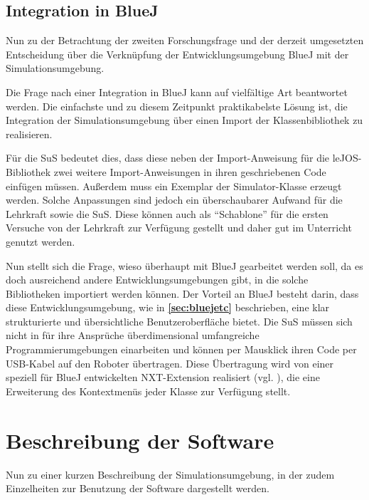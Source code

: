 \documentclass[paper=a4, DIV=calc, BCOR=12mm, twoside=on, onecolumn=on, open = right, titlepage =on, parskip =half-, headsepline = on, footsepline = off, chapterprefix = off, appendixprefix = on, fontsize = 12pt, numbers = noenddot, abstract = on]{scrbook}
\begin{document}
\par \singlespacing
\subsection{Integration in BlueJ}
\label{sec:integration}
\onehalfspacing
Nun zu der Betrachtung der zweiten Forschungsfrage und der derzeit umgesetzten Entscheidung über die Verknüpfung der Entwicklungsumgebung BlueJ mit der Simulationsumgebung.

Die Frage nach einer Integration in BlueJ kann auf vielfältige Art beantwortet werden. Die einfachste und zu diesem Zeitpunkt praktikabelste Lösung ist, die Integration der Simulationsumgebung über einen Import der Klassenbibliothek zu realisieren.

Für die SuS bedeutet dies, dass diese neben der Import-Anweisung für die leJOS-Bibliothek zwei weitere Import-Anweisungen in ihren geschriebenen Code einfügen müssen. Außerdem muss ein Exemplar der Simulator-Klasse erzeugt werden. Solche Anpassungen sind jedoch ein überschaubarer Aufwand für die Lehrkraft sowie die SuS. Diese können auch als "`Schablone"' für die ersten Versuche von der Lehrkraft zur Verfügung gestellt und daher gut im Unterricht genutzt werden.

Nun stellt sich die Frage, wieso überhaupt mit BlueJ gearbeitet werden soll, da es doch ausreichend andere Entwicklungsumgebungen gibt, in die solche Bibliotheken importiert werden können.
Der Vorteil an BlueJ besteht darin, dass diese Entwicklungsumgebung, wie in \textbf{\ref{sec:bluejetc}} beschrieben, eine klar strukturierte und übersichtliche Benutzeroberfläche bietet. Die SuS müssen sich nicht in für ihre Ansprüche überdimensional umfangreiche Programmierumgebungen einarbeiten und können per Mausklick ihren Code per USB-Kabel auf den Roboter übertragen. Diese Übertragung wird von einer speziell für BlueJ entwickelten NXT-Extension realisiert (vgl. \cite{bowes:12}), die eine Erweiterung des Kontextmenüs jeder Klasse zur Verfügung stellt. 


\par \singlespacing
\section{Beschreibung der Software}
\onehalfspacing

Nun zu einer kurzen Beschreibung der Simulationsumgebung, in der zudem Einzelheiten zur Benutzung der Software dargestellt werden.
\end{document}

